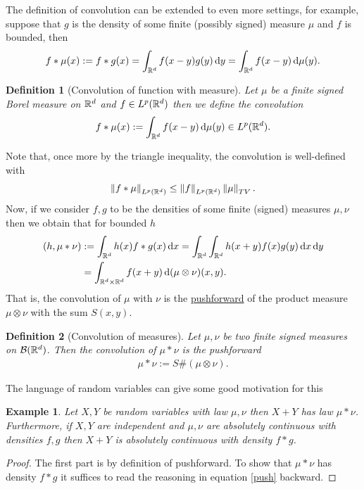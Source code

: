 \documentclass[12pt]{article}
\newtheorem{example}{Example}
\newtheorem{definition}{Definition}
\theoremstyle{remark}
\renewcommand{\norm}[1]{\left\lVert #1 \right\rVert}\renewcommand{\abs}[1]{\left| #1 \right|}
\renewcommand{\d}{\,\mathrm{d}}
\begin{document}
The definition of convolution can be extended to even more settings, for example, suppose that $g $ is the density of some finite (possibly signed) measure $\mu$ and  $f$ is bounded, then
\begin{align*}
	f*\mu(x):= f*g(x)= \int_{\R^d}f(x-y) g(y)\d y = \int_{\R^d} f(x-y)\d \mu (y) .
\end{align*}
\begin{definition}[Convolution of function with measure]
	Let $\mu $ be a finite signed Borel measure on $\mathbb{R}^d$ and  $f \in L^p(\mathbb{R}^d)$ then we define the convolution
	\begin{align*}
		f*\mu (x) :=\int_{\R^d} f(x-y)\d \mu (y) \in L^p(\R^d).
	\end{align*}
\end{definition}
Note that, once more by the triangle inequality, the convolution is well-defined with
\begin{align*}
	\norm{f* \mu }_{L^p(\R^d)} \leq \norm{f}_{L^p(\R^d)} \norm{\mu }_{TV} .
\end{align*}
Now, if we consider $f,g$ to be the densities of some finite (signed) measures  $\mu,\nu$ then we obtain that for bounded $h$
\begin{align}\label{push}
	(h, \mu *\nu) & := \int_{\R^d} h(x) f*g(x) \d x = \int_{\R^d}\int_{\R^d}  h(x+y) f(x)  g(y)\d x \d y \\
	              & = \int_{\R^d \times\R^d} f(x+y) \d (\mu \otimes \nu)(x,y)\notag .
\end{align}
That is, the convolution of $\mu$ with $\nu$ is the \href{https://en.wikipedia.org/wiki/Pushforward_measure}{pushforward}  of the product measure $\mu \otimes \nu$ with the sum $S(x,y)$.
\begin{definition}[Convolution of measures]
	Let $\mu ,\nu$ be two finite signed measures on $\mathcal{B}(\mathbb{R}^d)$. Then the convolution of  $\mu *\nu$ is the pushforward
	\begin{align*}
		\mu *\nu := S\# (\mu \otimes\nu).
	\end{align*}
\end{definition}
The language of random variables can give some good motivation for this
\begin{example}
	Let $X,Y$ be random variables with law  $\mu ,\nu$ then $X+Y$ has law  $\mu *\nu$. Furthermore, if $X, Y$ are independent and $\mu,\nu$ are absolutely continuous with densities $f,g$ then $X+Y$ is absolutely continuous with density $f*g$.
\end{example}
\begin{proof}
	The first part is by definition of pushforward. To show that  $\mu *\nu$ has density $f*g$  it suffices to read the reasoning in equation  \eqref{push} backward.
\end{proof}
\end{document}
